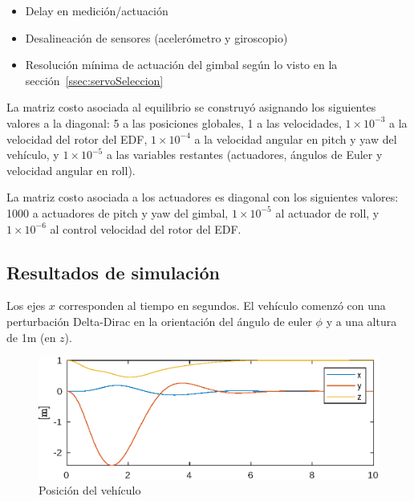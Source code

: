 \begin{itemize}
    \item Delay en medición/actuación
    \item Desalineación de sensores (acelerómetro y giroscopio)
    \item Resolución mínima de actuación del gimbal según lo visto en la sección~\ref{ssec:servoSeleccion}
\end{itemize}

La matriz costo asociada al equilibrio se construyó asignando los siguientes valores a la diagonal: 5 a las posiciones globales, 1 a las velocidades, $1\times10^{-3}$ a la velocidad del rotor del EDF, $1\times10^{-4}$ a la velocidad angular en pitch y yaw del vehículo, y $1\times10^{-5}$ a las variables restantes (actuadores, ángulos de Euler y velocidad angular en roll).

\medskip

La matriz costo asociada a los actuadores es diagonal con los siguientes valores: 1000 a actuadores de pitch y yaw del gimbal, $1\times10^{-5}$ al actuador de roll, y $1\times10^{-6}$ al control velocidad del rotor del EDF.


\subsection{Resultados de simulación}

Los ejes $x$ corresponden al tiempo en segundos. El vehículo comenzó con una perturbación Delta-Dirac en la orientación del ángulo de euler $\phi$ y a una altura de 1m (en $z$).

\begin{figure}[!ht]
    \centering
    \includegraphics[width=0.8\linewidth]{fig/pos_edf}
    \caption{Posición del vehículo}
    \label{fig:pos_edf}
\end{figure}

